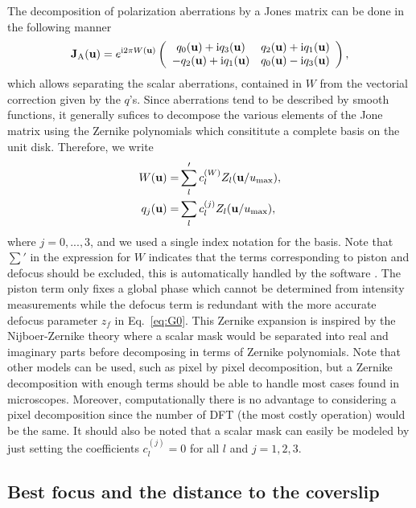 \documentclass[reprint,aps,pra,superscriptaddress,
amsmath,amssymb]{revtex4-1}
\begin{document}
The decomposition of polarization aberrations by a Jones matrix can be 
done in the following manner
\begin{align} \label{eq:jqw}
  \textbf J_\text{A}(\textbf u) = e^{\text{i} 2\pi W(\textbf u)} \left(
\begin{array}{cc}
q_0(\textbf u) + \text{i} q_3(\textbf u) &q_2(\textbf u) + \text{i} q_1(\textbf u) \\
-q_2(\textbf u) + \text{i} q_1(\textbf u) & q_0(\textbf u) - \text{i} q_3(\textbf u)
\end{array}
\right),
\end{align}
which allows separating the scalar aberrations, contained 
in $W$ from the vectorial correction given by the $q$'s. 
Since aberrations tend to be described by smooth functions, it generally 
sufices to decompose the various elements of the Jone matrix using the 
Zernike polynomials which consititute a complete basis on the unit disk.
Therefore, we write
\begin{align}
  W (\textbf u) = &\sum'_l c_{l}^{(W)} Z_l(\textbf u/u_\text{max}) ,\\
  q_{j} (\textbf u) = &\sum_l c_{l}^{(j)} Z_l(\textbf u/u_\text{max}),
\end{align}
where $j=0,...,3$, and we used a single index notation for the basis. 
Note that $\sum'$ in the expression for $W$ indicates that the terms 
corresponding to piston and defocus should be excluded, this is 
automatically handled by the software \cite{}. The piston term only 
fixes a global phase which cannot be determined from intensity measurements
while the defocus term is redundant with the more accurate defocus parameter
$z_f$ in Eq.~\ref{eq:G0}.
This Zernike expansion is inspired by the Nijboer-Zernike theory 
\cite{janssen2002extended,braat2003extended,braat2005extended} where a 
scalar mask would be separated into real and imaginary parts before 
decomposing in terms of Zernike polynomials. 
Note that other models can be used, such as 
pixel by pixel decomposition, but a Zernike decomposition with enough 
terms should be able to handle most cases found in microscopes. Moreover, 
computationally there is no advantage to considering a pixel decomposition 
since the number of DFT (the most costly operation) would be the same.
It should also  be noted that a scalar mask can easily be modeled by just
setting the coefficients $c^{(j)}_l=0$ for all $l$ and $j=1,2,3$.


\subsection{Best focus and the distance to the coverslip}
\end{document}
